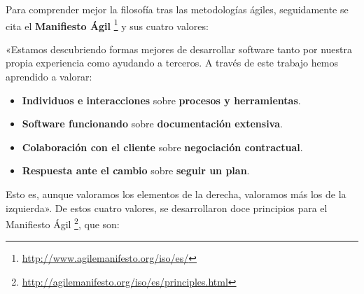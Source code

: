 Para comprender mejor la filosofía tras las metodologías ágiles, seguidamente se cita el \textbf{Manifiesto Ágil} \footnote{\url{http://www.agilemanifesto.org/iso/es/}} y sus cuatro valores:

«Estamos descubriendo formas mejores de desarrollar software tanto por nuestra propia experiencia como ayudando a terceros. A través de este trabajo hemos aprendido a valorar:

\begin{itemize}
\item \textbf{Individuos e interacciones} sobre \textbf{procesos y herramientas}.
\item \textbf{Software funcionando} sobre \textbf{documentación extensiva}.
\item \textbf{Colaboración con el cliente} sobre \textbf{negociación contractual}.
\item \textbf{Respuesta ante el cambio} sobre \textbf{seguir un plan}.
\end{itemize}

Esto es, aunque valoramos los elementos de la derecha, valoramos más los de la izquierda». De estos cuatro valores, se desarrollaron doce principios para el Manifiesto Ágil \footnote{\url{http://agilemanifesto.org/iso/es/principles.html}}, que son:

